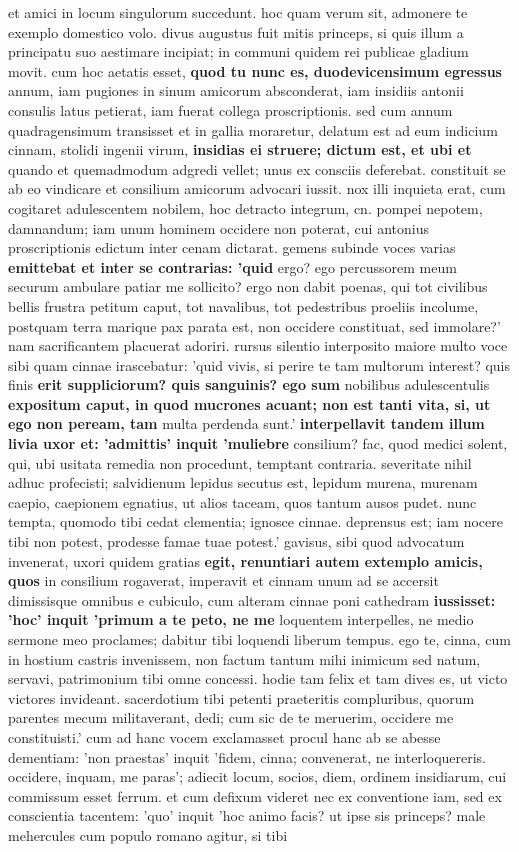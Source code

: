 et amici in locum singulorum succedunt. hoc quam verum sit, admonere te exemplo domestico volo. divus augustus fuit mitis princeps, si quis illum a principatu suo aestimare incipiat; in communi quidem rei publicae gladium movit. cum hoc aetatis esset, \textbf{quod tu nunc es, duodevicensimum egressus} annum, iam pugiones in sinum amicorum absconderat, iam insidiis antonii consulis latus petierat, iam fuerat collega proscriptionis. sed cum annum quadragensimum transisset et in gallia moraretur, delatum est ad eum indicium cinnam, stolidi ingenii virum, \textbf{insidias ei struere; dictum est, et ubi et} quando et quemadmodum adgredi vellet; unus ex consciis deferebat. constituit se ab eo vindicare et consilium amicorum advocari iussit. nox illi inquieta erat, cum cogitaret adulescentem nobilem, hoc detracto integrum, cn. pompei nepotem, damnandum; iam unum hominem occidere non poterat, cui antonius proscriptionis edictum inter cenam dictarat. gemens subinde voces varias \textbf{emittebat et inter se contrarias: 'quid} ergo? ego percussorem meum securum ambulare patiar me sollicito? ergo non dabit poenas, qui tot civilibus bellis frustra petitum caput, tot navalibus, tot pedestribus proeliis incolume, postquam terra marique pax parata est, non occidere constituat, sed immolare?' nam sacrificantem placuerat adoriri. rursus silentio interposito maiore multo voce sibi quam cinnae irascebatur: 'quid vivis, si perire te tam multorum interest? quis finis \textbf{\textbf{erit \textbf{suppliciorum? quis sanguinis? ego} sum}} nobilibus adulescentulis \textbf{expositum caput, in quod mucrones acuant; \textbf{non} \textbf{est tanti vita, si, ut ego non peream, tam}} multa perdenda sunt.' \textbf{interpellavit tandem illum \textbf{livia uxor} et: 'admittis' inquit 'muliebre} consilium? fac, quod medici solent, qui, ubi usitata remedia non procedunt, temptant contraria. severitate nihil adhuc profecisti; salvidienum lepidus secutus est, lepidum murena, murenam caepio, caepionem egnatius, ut alios taceam, quos tantum ausos pudet. nunc tempta, quomodo tibi cedat clementia; ignosce cinnae. deprensus est; iam nocere tibi non potest, prodesse famae tuae potest.' gavisus, sibi quod advocatum invenerat, uxori quidem gratias \textbf{egit, renuntiari autem extemplo amicis, quos} in consilium rogaverat, imperavit et cinnam unum ad se accersit dimissisque omnibus e cubiculo, cum alteram cinnae poni cathedram \textbf{iussisset: 'hoc' inquit 'primum a te peto, ne me} loquentem interpelles, ne medio sermone meo proclames; dabitur tibi loquendi liberum tempus. ego te, cinna, cum in hostium castris invenissem, non factum tantum mihi inimicum sed natum, servavi, patrimonium tibi omne concessi. hodie tam felix et tam dives es, ut victo victores invideant. sacerdotium tibi petenti praeteritis compluribus, quorum parentes mecum militaverant, dedi; cum sic de te meruerim, occidere me constituisti.' cum ad hanc vocem exclamasset procul hanc ab se abesse dementiam: 'non praestas' inquit 'fidem, cinna; convenerat, ne interloquereris. occidere, inquam, me paras'; adiecit locum, socios, diem, ordinem insidiarum, cui commissum esset ferrum. et cum defixum videret nec ex conventione iam, sed ex conscientia tacentem: 'quo' inquit 'hoc animo facis? ut ipse sis princeps? male mehercules cum populo romano agitur, si tibi 